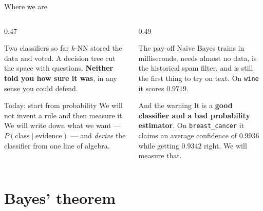 \documentclass[aspectratio=169]{beamer}
\begin{document}
\begin{frame}[shrink=5]{Where we are}
  \begin{columns}[T]
    \begin{column}{0.47\textwidth}
      \begin{block}{Two classifiers so far}
        $k$-NN stored the data and voted. A decision tree cut the space with
        questions. \textbf{Neither told you how sure it was}, in any sense you
        could defend.
      \end{block}
      \begin{block}{Today: start from probability}
        We will not invent a rule and then measure it. We will write down
        what we want --- $P(\text{class} \mid \text{evidence})$ --- and
        \emph{derive} the classifier from one line of algebra.
      \end{block}
    \end{column}
    \begin{column}{0.49\textwidth}
      \begin{exampleblock}{The pay-off}
        Naive Bayes trains in milliseconds, needs almost no data, is the
        historical spam filter, and is still the first thing to try on text.
        On \texttt{wine} it scores $0.9719$.
      \end{exampleblock}
      \begin{alertblock}{And the warning}
        It is a \textbf{good classifier and a bad probability estimator}. On
        \texttt{breast\_cancer} it claims an average confidence of
        $\mathbf{0.9936}$ while getting $\mathbf{0.9342}$ right. We will
        measure that.
      \end{alertblock}
    \end{column}
  \end{columns}
\end{frame}

\section[Bayes' theorem]{Bayes' theorem}
\label{sec:bayes}
\end{document}

